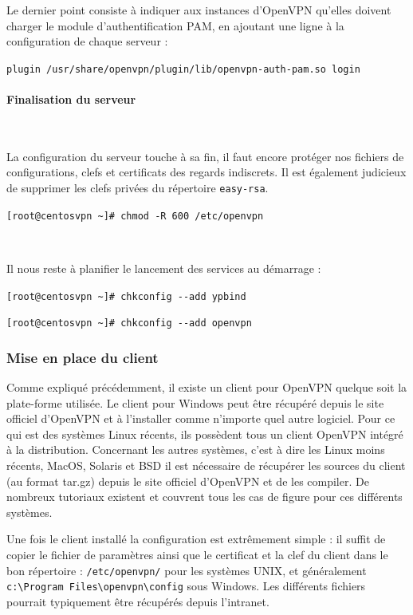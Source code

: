 Le dernier point consiste à indiquer aux instances d'OpenVPN qu'elles doivent charger le module d'authentification PAM, en ajoutant une ligne à la configuration de chaque serveur :

\verb|plugin /usr/share/openvpn/plugin/lib/openvpn-auth-pam.so login|


\paragraph{Finalisation du serveur}
~

La configuration du serveur touche à sa fin, il faut encore protéger nos fichiers de configurations, clefs et certificats des regards indiscrets. Il est également judicieux de supprimer les clefs privées du répertoire \verb|easy-rsa|.

\verb|[root@centosvpn ~]# chmod -R 600 /etc/openvpn|

~

Il nous reste à planifier le lancement des services au démarrage :

\verb|[root@centosvpn ~]# chkconfig --add ypbind|

\verb|[root@centosvpn ~]# chkconfig --add openvpn|

\subsubsection{Mise en place du client}

Comme expliqué précédemment, il existe un client pour OpenVPN quelque soit la plate-forme utilisée. Le client pour Windows peut être récupéré depuis le site officiel d'OpenVPN et à l'installer comme n'importe quel autre logiciel. Pour ce qui est des systèmes Linux récents, ils possèdent tous un client OpenVPN intégré à la distribution. Concernant les autres systèmes, c'est à dire les Linux moins récents, MacOS, Solaris et BSD il est nécessaire de récupérer les sources du client (au format tar.gz) depuis le site officiel d'OpenVPN et de les compiler. De nombreux tutoriaux existent et couvrent tous les cas de figure pour ces différents systèmes.

Une fois le client installé la configuration est extrêmement simple : il suffit de copier le fichier de paramètres ainsi que le certificat et la clef du client dans le bon répertoire : \verb|/etc/openvpn/| pour les systèmes UNIX, et généralement \verb|c:\Program Files\openvpn\config| sous Windows. Les différents fichiers pourrait typiquement être récupérés depuis l'intranet.

